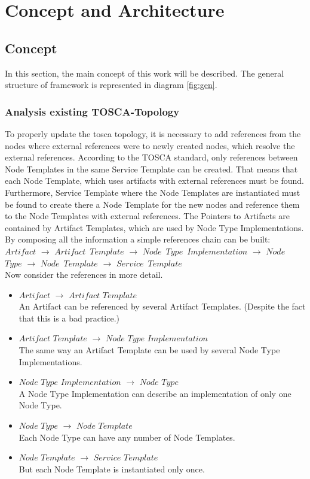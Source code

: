 
\chapter{Concept and Architecture}\label{chap:conarch}
\section{Concept}
In this section, the main concept of this work will be described.
The general structure of framework is represented in diagram \ref{fig:gen}.



\subsection{Analysis existing TOSCA-Topology}\label{subs:analyse}
To properly update the \gls{tosca} topology, it is necessary to add references from the nodes where external references were to newly created nodes, which resolve the external references. 
According to the TOSCA standard, only references between Node Templates in the same Service Template can be created.  
That means that each Node Template, which uses artifacts with external references must be found.
Furthermore, Service Template where the Node Templates are instantiated must be found to create there a Node Template for the new nodes and reference them to the Node Templates with external references.
The Pointers to Artifacts are contained by Artifact Templates, which are used by Node Type Implementations.
By composing all the information a simple references chain can be built:\\
$Artifact$ $\rightarrow$ $Artifact$~$Template$ $\rightarrow$ $Node$~$Type$~$Implementation$ $\rightarrow$ $Node$~$Type$ $\rightarrow$ $Node$~$Template$ $\rightarrow$ $Service$~$Template$\\
Now consider the references in more detail. 
\begin{itemize}
	\item $Artifact$ $\rightarrow$ $Artifact$ $Template$\\
	An Artifact can be referenced by several Artifact Templates. (Despite the fact that this is a bad practice.)
	\item  $Artifact$ $Template$ $\rightarrow$ $Node$ $Type$ $Implementation$ \\
	The same way an Artifact Template can be used by several Node Type Implementations.
	\item $Node$ $Type$ $Implementation$ $\rightarrow$ $Node$ $Type$ \\
	A Node Type Implementation can describe an implementation of only one Node Type.
	\item  $Node$ $Type$ $\rightarrow$ $Node$ $Template$\\
	Each Node Type can have any number of Node Templates.
	\item  $Node$ $Template$ $\rightarrow$ $Service$ $Template$\\
	But each Node Template is instantiated only once.
\end{itemize}
